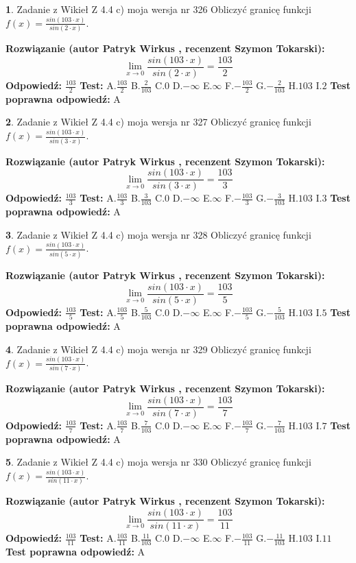 \documentclass[12pt, a4paper]{article}
\theoremstyle{definition} %
\newtheorem{zad}{}
\newcommand{\zadStart}[1]{\begin{zad}#1\newline}
\newcommand{\zadStop}{\end{zad}}
\newcommand{\rozwStart}[2]{\noindent \textbf{Rozwiązanie (autor #1 , recenzent #2): }\newline}
\newcommand{\rozwStop}{\newline}
\newcommand{\odpStart}{\noindent \textbf{Odpowiedź:}\newline}
\newcommand{\odpStop}{\newline}
\newcommand{\testStart}{\noindent \textbf{Test:}\newline}
\newcommand{\testStop}{\newline}
\newcommand{\kluczStart}{\noindent \textbf{Test poprawna odpowiedź:}\newline}
\newcommand{\kluczStop}{\newline}
\begin{document}
\zadStart{Zadanie z Wikieł Z 4.4 c) moja wersja nr 326}
Obliczyć granicę funkcji $f(x)=\frac{sin(103\cdot x)}{sin(2\cdot x)}$.
\zadStop
\rozwStart{Patryk Wirkus}{Szymon Tokarski}
$$\lim\limits_{x\to 0}\frac{sin(103\cdot x)}{sin(2\cdot x)}=
\frac{103}{2}$$
\rozwStop
\odpStart
$\frac{103}{2}$
\odpStop
\testStart
A.$\frac{103}{2}$
B.$\frac{2}{103}$
C.$0$
D.$-\infty$
E.$\infty$
F.$-\frac{103}{2}$
G.$-\frac{2}{103}$
H.$103$
I.$2$
\testStop
\kluczStart
A
\kluczStop



\zadStart{Zadanie z Wikieł Z 4.4 c) moja wersja nr 327}
Obliczyć granicę funkcji $f(x)=\frac{sin(103\cdot x)}{sin(3\cdot x)}$.
\zadStop
\rozwStart{Patryk Wirkus}{Szymon Tokarski}
$$\lim\limits_{x\to 0}\frac{sin(103\cdot x)}{sin(3\cdot x)}=
\frac{103}{3}$$
\rozwStop
\odpStart
$\frac{103}{3}$
\odpStop
\testStart
A.$\frac{103}{3}$
B.$\frac{3}{103}$
C.$0$
D.$-\infty$
E.$\infty$
F.$-\frac{103}{3}$
G.$-\frac{3}{103}$
H.$103$
I.$3$
\testStop
\kluczStart
A
\kluczStop



\zadStart{Zadanie z Wikieł Z 4.4 c) moja wersja nr 328}
Obliczyć granicę funkcji $f(x)=\frac{sin(103\cdot x)}{sin(5\cdot x)}$.
\zadStop
\rozwStart{Patryk Wirkus}{Szymon Tokarski}
$$\lim\limits_{x\to 0}\frac{sin(103\cdot x)}{sin(5\cdot x)}=
\frac{103}{5}$$
\rozwStop
\odpStart
$\frac{103}{5}$
\odpStop
\testStart
A.$\frac{103}{5}$
B.$\frac{5}{103}$
C.$0$
D.$-\infty$
E.$\infty$
F.$-\frac{103}{5}$
G.$-\frac{5}{103}$
H.$103$
I.$5$
\testStop
\kluczStart
A
\kluczStop



\zadStart{Zadanie z Wikieł Z 4.4 c) moja wersja nr 329}
Obliczyć granicę funkcji $f(x)=\frac{sin(103\cdot x)}{sin(7\cdot x)}$.
\zadStop
\rozwStart{Patryk Wirkus}{Szymon Tokarski}
$$\lim\limits_{x\to 0}\frac{sin(103\cdot x)}{sin(7\cdot x)}=
\frac{103}{7}$$
\rozwStop
\odpStart
$\frac{103}{7}$
\odpStop
\testStart
A.$\frac{103}{7}$
B.$\frac{7}{103}$
C.$0$
D.$-\infty$
E.$\infty$
F.$-\frac{103}{7}$
G.$-\frac{7}{103}$
H.$103$
I.$7$
\testStop
\kluczStart
A
\kluczStop



\zadStart{Zadanie z Wikieł Z 4.4 c) moja wersja nr 330}
Obliczyć granicę funkcji $f(x)=\frac{sin(103\cdot x)}{sin(11\cdot x)}$.
\zadStop
\rozwStart{Patryk Wirkus}{Szymon Tokarski}
$$\lim\limits_{x\to 0}\frac{sin(103\cdot x)}{sin(11\cdot x)}=
\frac{103}{11}$$
\rozwStop
\odpStart
$\frac{103}{11}$
\odpStop
\testStart
A.$\frac{103}{11}$
B.$\frac{11}{103}$
C.$0$
D.$-\infty$
E.$\infty$
F.$-\frac{103}{11}$
G.$-\frac{11}{103}$
H.$103$
I.$11$
\testStop
\kluczStart
A
\kluczStop
\end{document}
